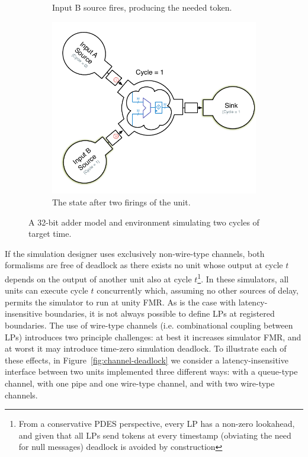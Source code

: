\begin{figure}
\begin{subfigure}[t]{0.45\textwidth}
        \caption{Input B source fires, producing the needed token.}
    \end{subfigure}
    \begin{subfigure}[t]{0.45\textwidth}
        \includegraphics[width=\columnwidth]{figures/adder-example5.pdf}
        \caption{The state after two firings of the unit.}
    \end{subfigure}
    \centering
    \caption{A 32-bit adder model and environment simulating two cycles of target time.}
    \label{fig:adder-example}
\end{figure}

If the simulation designer uses exclusively non-wire-type channels, both
formalisms are free of deadlock as there exists no unit whose output at cycle
$t$ depends on the output of another unit also at cycle $t$\footnote{From a
conservative PDES perspective, every LP has a non-zero lookahead, and given that
all LPs send tokens at every timestamp (obviating the need for null
messages) deadlock is avoided by construction}. In these simulators, all units
can execute cycle $t$ concurrently which, assuming no other sources of delay,
permits the simulator to run at unity FMR.  As is the case with latency-insensitive boundaries, it is not always possible to define LPs
at registered boundaries.  The use of wire-type channels (i.e. combinational
coupling between LPs) introduces two principle challenges: at best it
increases simulator FMR, and at worst it may introduce time-zero simulation
deadlock. To illustrate each of these effects, in Figure~\ref{fig:channel-deadlock} we consider a
latency-insensitive interface between two units implemented three different ways: with a queue-type
channel, with one pipe and one wire-type channel, and with two wire-type channels.

